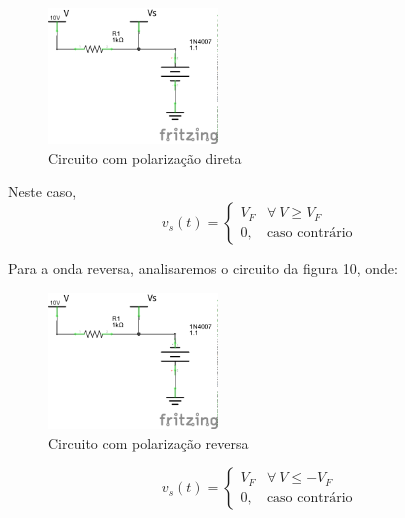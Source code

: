 \documentclass[12pt, a4paper, twoside]{article}
\begin{document}
\begin{figure}[H]
    \centering
    \includegraphics[width=0.4\textwidth]{figs/rel3/c6-1.png}
    \caption{Circuito com polarização direta}
\end{figure}

Neste caso,
\begin{equation}
    v_s(t) =
    \begin{cases}
        V_F & \forall\ V \geq V_F \\
        0, & \text{caso contrário}
    \end{cases}
\end{equation}

Para a onda reversa, analisaremos o circuito da figura 10, onde:

\begin{figure}[H]
    \centering
    \includegraphics[width=0.4\textwidth]{figs/rel3/c6-2.png}
    \caption{Circuito com polarização reversa}
\end{figure}

\begin{equation}
    v_s(t) =
    \begin{cases}
        V_F & \forall\ V \leq -V_F \\
        0, & \text{caso contrário}
    \end{cases}
\end{equation}
\end{document}
